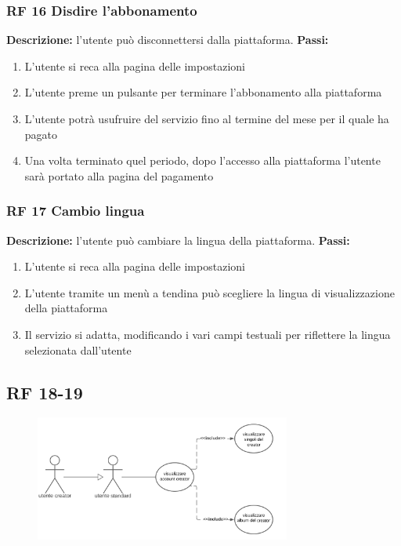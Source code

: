 \documentclass[a4paper,12pt]{article}
\begin{document}
\subsubsection*{RF 16 Disdire l'abbonamento}

\textbf{Descrizione:} l’utente può disconnettersi dalla piattaforma. \newline
\textbf{Passi:}
\begin{enumerate}
    \item L’utente si reca alla pagina delle impostazioni
    \item L’utente preme un pulsante per terminare l’abbonamento alla piattaforma
    \item L’utente potrà usufruire del servizio fino al termine del mese per il quale ha pagato
    \item Una volta terminato quel periodo, dopo l’accesso alla piattaforma l’utente sarà portato alla pagina del pagamento
\end{enumerate}

\subsubsection*{RF 17 Cambio lingua}

\textbf{Descrizione:}  l’utente può cambiare la lingua della piattaforma. \newline
\textbf{Passi:}
\begin{enumerate}
    \item L'utente si reca alla pagina delle impostazioni
    \item L’utente tramite un menù a tendina può scegliere la lingua di visualizzazione della piattaforma
    \item Il servizio si adatta, modificando i vari campi testuali per riflettere la lingua selezionata dall’utente
\end{enumerate}

\subsection*{RF 18-19}

\begin{figure}[htp]
    \centering
    \includegraphics[width=0.75\textwidth]{diagrams/use-case-18-19.png}
\end{figure}
\end{document}

